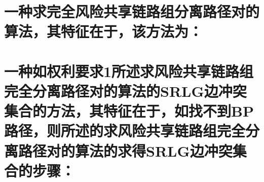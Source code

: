 ﻿\thispagestyle{fancy}
\fancyhf{} %
\setcounter{page}{1}
\fancyfoot[C]{\bfseries\thepage}
\fancyhead[CO]{\bfseries\rightmark}
\fancyhead[RE]{\bfseries\leftmark}
\renewcommand{\headrulewidth}{0.4pt}
\renewcommand{\footrulewidth}{0pt}
\section{一种求完全风险共享链路组分离路径对的算法，其特征在于，该方法为：}

\section{一种如权利要求1所述求风险共享链路组完全分离路径对的算法的SRLG边冲突集合的方法，其特征在于，如找不到BP路径，则所述的求风险共享链路组完全分离路径对的算法的求得SRLG边冲突集合的步骤：}

